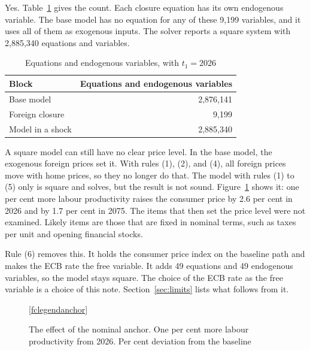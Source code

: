 \documentclass[11pt,a4paper]{article}
\begin{document}
Yes. Table~\ref{tab:square} gives the count.
Each closure equation has its own endogenous variable. The base model has no equation for any of these 9{,}199 variables, and it uses all of them as exogenous inputs.
The solver reports a square system with 2{,}885{,}340 equations and variables.

\begin{table}[H]
\centering
\small
\caption{Equations and endogenous variables, with $t_1 = 2026$}
\label{tab:square}
\begin{tabular}{@{}lr@{}}
\toprule
Block & Equations and endogenous variables \\
\midrule
Base model & 2{,}876{,}141 \\
Foreign closure & 9{,}199 \\
\midrule
Model in a shock & 2{,}885{,}340 \\
\bottomrule
\end{tabular}
\end{table}

A square model can still have no clear price level. In the base model, the exogenous foreign prices set it.
With rules (1), (2), and (4), all foreign prices move with home prices, so they no longer do that.
The model with rules (1) to (5) only is square and solves, but the result is not sound. Figure~\ref{fig:anchor} shows it: one per cent more labour productivity raises the consumer price by 2.6 per cent in 2026 and by 1.7 per cent in 2075.
The items that then set the price level were not examined. Likely items are those that are fixed in nominal terms, such as taxes per unit and opening financial stocks.

Rule (6) removes this. It holds the consumer price index on the baseline path and makes the ECB rate the free variable.
It adds 49 equations and 49 endogenous variables, so the model stays square.
The choice of the ECB rate as the free variable is a choice of this note. Section~\ref{sec:limits} lists what follows from it.

\begin{figure}[H]
\centering
{}

\ref{fclegendanchor}
\caption{The effect of the nominal anchor. One per cent more labour productivity from 2026. Per cent deviation from the baseline}
\label{fig:anchor}
\end{figure}
\end{document}
